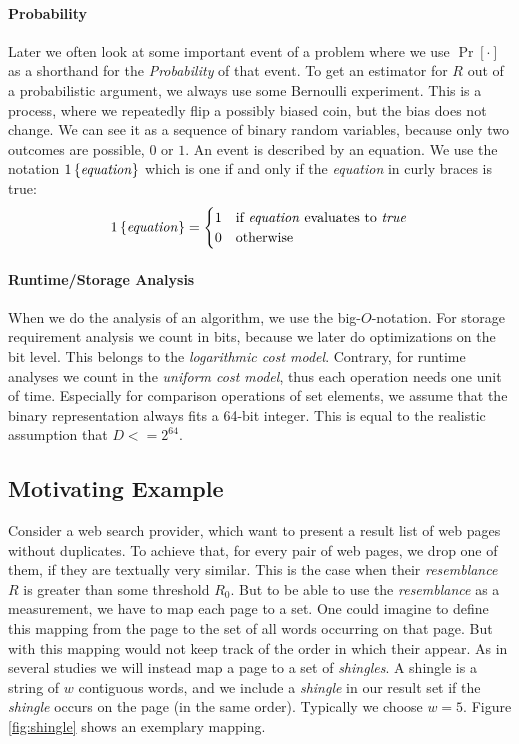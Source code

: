 \documentclass[a4paper]{article}
\begin{document}
\paragraph{Probability}
 
Later we often look at some important event of a problem where we use $\Pr[\cdot]$ as a shorthand for the \emph{Probability} of that event. To get an estimator for $R$ out of a probabilistic argument, we always use some Bernoulli experiment. This is a process, where we repeatedly flip a possibly biased coin, but the bias does not change. We can see it as a sequence of binary random variables, because only two outcomes are possible, $0$ or $1$. An event is described by an equation. We use the notation $1\left\lbrace \text{\textit{equation}} \right\rbrace$ which is one if and only if the \textit{equation} in curly braces is true:
\begin{equation*}
1\left\lbrace \text{\textit{equation}} \right\rbrace =\begin{cases}
    1 & \text{if \textit{equation} evaluates to \textit{true}} \\
    0 & \text{otherwise}
\end{cases}
\end{equation*}

\paragraph{Runtime/Storage Analysis}

When we do the analysis of an algorithm, we use the big-$O$-notation. For storage requirement analysis we count in bits, because we later do optimizations on the bit level. This belongs to the \textit{logarithmic cost model}. Contrary, for runtime analyses we count in the \textit{uniform cost model}, thus each operation needs one unit of time. Especially for comparison operations of set elements, we assume that the binary representation always fits a 64-bit integer. This is equal to the realistic assumption that $D <= 2^{64}$.

\subsection{Motivating Example}
Consider a web search provider, which want to present a result list of web pages without duplicates. To achieve that, for every pair of web pages, we drop one of them, if they are textually very similar. This is the case when their \emph{resemblance} $R$ is greater than some threshold $R_0$. But to be able to use the \emph{resemblance} as a measurement, we have to map each page to a set. One could imagine to define this mapping from the page to the set of all words occurring on that page. But with this mapping would not keep track of the order in which their appear. As in several studies \citep{Broder:1998,BroderGMZ97} we will instead map a page to a set of \emph{shingles}. A shingle is a string of $w$ contiguous words, and we include a \emph{shingle} in our result set if the \emph{shingle} occurs on the page (in the same order). Typically we choose $w = 5$. Figure \vref{fig:shingle} shows an exemplary mapping.
\end{document}
